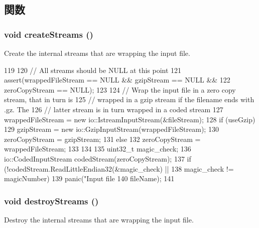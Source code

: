 \subsection{関数}
\hypertarget{classProtoInputStream_a120791921d99499a4f35da13544dca57}{
\subsubsection[{createStreams}]{\setlength{\rightskip}{0pt plus 5cm}void createStreams ()}}
\label{classProtoInputStream_a120791921d99499a4f35da13544dca57}
Create the internal streams that are wrapping the input file. 


\begin{DoxyCode}
119 {
120     // All streams should be NULL at this point
121     assert(wrappedFileStream == NULL && gzipStream == NULL &&
122            zeroCopyStream == NULL);
123 
124     // Wrap the input file in a zero copy stream, that in turn is
125     // wrapped in a gzip stream if the filename ends with .gz. The
126     // latter stream is in turn wrapped in a coded stream
127     wrappedFileStream = new io::IstreamInputStream(&fileStream);
128     if (useGzip) {
129         gzipStream = new io::GzipInputStream(wrappedFileStream);
130         zeroCopyStream = gzipStream;
131     } else {
132         zeroCopyStream = wrappedFileStream;
133     }
134 
135     uint32_t magic_check;
136     io::CodedInputStream codedStream(zeroCopyStream);
137     if (!codedStream.ReadLittleEndian32(&magic_check) ||
138         magic_check != magicNumber)
139         panic("Input file %
140               fileName);
141 }
\end{DoxyCode}
\hypertarget{classProtoInputStream_a47259bcb029441264a635ffc9483349c}{
\subsubsection[{destroyStreams}]{\setlength{\rightskip}{0pt plus 5cm}void destroyStreams ()}}
\label{classProtoInputStream_a47259bcb029441264a635ffc9483349c}
Destroy the internal streams that are wrapping the input file. 


